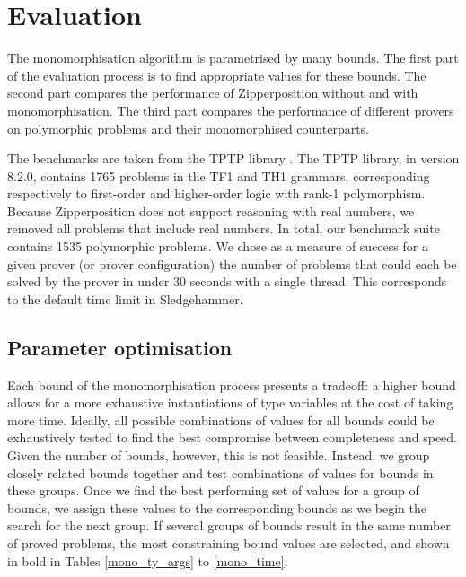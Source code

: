 \documentclass[]{ceurart}
\begin{document}
\section{Evaluation}
\label{sec:evaluation}

The monomorphisation algorithm is parametrised by many bounds. The first part of the evaluation process is to find appropriate values for these bounds. The second part compares the performance of Zipperposition without and with monomorphisation. The third part compares the performance of different provers on polymorphic problems and their monomorphised counterparts.

The benchmarks are taken from the TPTP library \cite{tptp}. The TPTP library, in version 8.2.0, contains 1765 problems in the TF1 and TH1 grammars, corresponding respectively to first-order and higher-order logic with rank-1 polymorphism. Because Zipperposition does not support reasoning with real numbers, we removed all problems that include real numbers. In total, our benchmark suite contains 1535 polymorphic problems. We chose as a measure of success for a given prover (or prover configuration) the number of problems that could each be solved by the prover in under 30 seconds with a single thread. This corresponds to the default time limit in Sledgehammer.

\subsection{Parameter optimisation}
\label{param_opti}

Each bound of the monomorphisation process presents a tradeoff: a higher bound allows for a more exhaustive instantiations of type variables at the cost of taking more time. Ideally, all possible combinations of values for all bounds could be exhaustively tested to find the best compromise between completeness and speed. Given the number of bounds, however, this is not feasible. Instead, we group closely related bounds together and test combinations of values for bounds in these groups. Once we find the best performing set of values for a group of bounds, we assign these values to the corresponding bounds as we begin the search for the next group. If several groups of bounds result in the same number of proved problems, the most constraining bound values are selected, and shown in bold in Tables \ref{mono_ty_args} to \ref{mono_time}.
\end{document}
